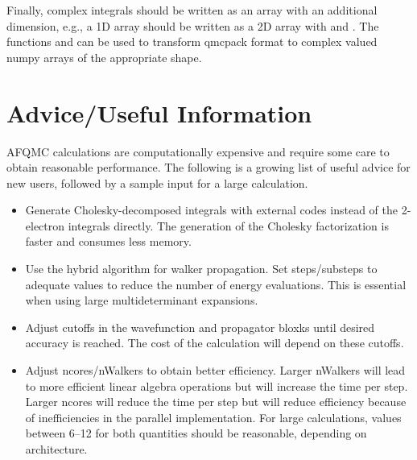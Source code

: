 Finally, complex integrals should be written as an array with an additional dimension, e.g., a 1D array should be written as a 2D array with  and . The functions  and  can be used to transform qmcpack format to complex valued numpy arrays of the appropriate shape.
\section{Advice/Useful Information}

AFQMC calculations are computationally expensive and require some care to obtain reasonable performance.
The following is a growing list of useful advice for new users, followed by a sample input for a large calculation.
\begin{itemize}
\item Generate Cholesky-decomposed integrals with external codes instead of the 2-electron integrals directly. The generation of the Cholesky factorization is faster and consumes less memory. 
\item Use the hybrid algorithm for walker propagation. Set steps/substeps to adequate values to reduce the number of energy evaluations. This is essential when using large multideterminant expansions.
\item Adjust cutoffs in the wavefunction and propagator bloxks until desired accuracy is reached. The cost of the calculation will depend on these cutoffs.
\item Adjust ncores/nWalkers to obtain better efficiency. Larger nWalkers will lead to more efficient linear algebra operations but will increase the time per step. Larger ncores will reduce the time per step but will reduce efficiency because of inefficiencies in the parallel implementation. For large calculations, values between 6--12 for both quantities should be reasonable, depending on architecture. 
\end{itemize}

